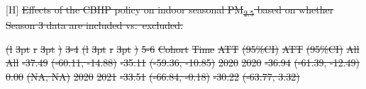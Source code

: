 \documentclass[
  letterpaper,
  DIV=11,
  numbers=noendperiod]{scrartcl}
\makeatletter
\renewenvironment{table}%
   {\renewcommand\familydefault\sfdefault
    \@float{table}}
   {\end@float}
\providecommand{\DIFdel}[1]{{\protect\color{red}\sout{#1}}}                      %
\providecommand{\DIFdelbegin}{} %
\providecommand{\DIFdelend}{} %
\providecommand{\DIFdelFL}[1]{\DIFdel{#1}} %
\providecommand{\DIFdelbeginFL}{} %
\providecommand{\DIFdelendFL}{} %
\newcommand{\DIFscaledelfig}{0.5}
\newlength{\DIFdelgraphicswidth} %
\newlength{\DIFdelgraphicsheight} %
\newcommand{\DIFdelincludegraphics}[2][]{%
\sbox{\DIFdelgraphicsbox}{\DIFOincludegraphics[#1]{#2}}%
\settoboxwidth{\DIFdelgraphicswidth}{\DIFdelgraphicsbox} %
\settoboxtotalheight{\DIFdelgraphicsheight}{\DIFdelgraphicsbox} %
\scalebox{\DIFscaledelfig}{%
\parbox[b]{\DIFdelgraphicswidth}{\usebox{\DIFdelgraphicsbox}\\[-\baselineskip] \rule{\DIFdelgraphicswidth}{0em}}\llap{\resizebox{\DIFdelgraphicswidth}{\DIFdelgraphicsheight}{%
\setlength{\unitlength}{\DIFdelgraphicswidth}%
\begin{picture}(1,1)%
\thicklines\linethickness{2pt} %
{\color[rgb]{1,0,0}\put(0,0){\framebox(1,1){}}}%
{\color[rgb]{1,0,0}\put(0,0){\line( 1,1){1}}}%
{\color[rgb]{1,0,0}\put(0,1){\line(1,-1){1}}}%
\end{picture}%
}\hspace*{3pt}}} %
} %
\DeclareRobustCommand{\DIFdelbegin}{\DIFOdelbegin \let\includegraphics\DIFdelincludegraphics} %
\DeclareRobustCommand{\DIFdelend}{\DIFOaddend \let\includegraphics\DIFOincludegraphics} %
\DeclareRobustCommand{\DIFdelbeginFL}{\DIFOdelbeginFL \let\includegraphics\DIFdelincludegraphics} %
\DeclareRobustCommand{\DIFdelendFL}{\DIFOaddendFL \let\includegraphics\DIFOincludegraphics} %
\makeatother
\begin{document}
\DIFdelbegin %
\DIFdelend \begin{table}[H]
\DIFdelbeginFL %
{%
\DIFdelFL{Effects of the CBHP policy on indoor seasonal PM\textsubscript{2.5}
based on whether Season 3 data are included vs.~excluded. }}%
\DIFdelendFL 

\DIFdelbeginFL %
\DIFdelFL{(l}%
\DIFdelFL{3pt}%
\DIFdelFL{r}%
\DIFdelFL{3pt}%
\DIFdelFL{)}%
\DIFdelFL{3-4}%
\DIFdelFL{(l}%
\DIFdelFL{3pt}%
\DIFdelFL{r}%
\DIFdelFL{3pt}%
\DIFdelFL{)}%
\DIFdelFL{5-6}%
\DIFdelFL{Cohort }%
\DIFdelFL{Time }%
\DIFdelFL{ATT }%
\DIFdelFL{(95\%CI) }%
\DIFdelFL{ATT }%
\DIFdelFL{(95\%CI)}%
\DIFdelFL{All }%
\DIFdelFL{All }%
\DIFdelFL{-37.49 }%
\DIFdelFL{(-60.11, -14.88) }%
\DIFdelFL{-35.11 }%
\DIFdelFL{(-59.36, -10.85)}%
\DIFdelFL{2020 }%
\DIFdelFL{2020 }%
\DIFdelFL{-36.94 }%
\DIFdelFL{(-61.39, -12.49) }%
\DIFdelFL{0.00 }%
\DIFdelFL{(NA, NA)}%
\DIFdelFL{2020 }%
\DIFdelFL{2021 }%
\DIFdelFL{-33.51 }%
\DIFdelFL{(-66.84, -0.18) }%
\DIFdelFL{-30.22 }%
\DIFdelFL{(-63.77, 3.32)}%

\end{table}
\end{document}
